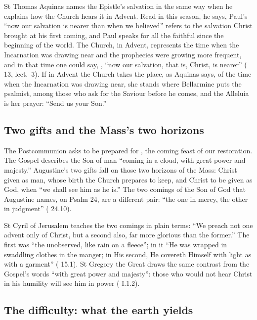 St Thomas Aquinas names the Epistle's salvation in the same way when he
explains how the Church hears it in Advent. Read in this season, he says,
Paul's ``now our salvation is nearer than when we believed'' refers to the
salvation Christ brought at his first coming, and Paul speaks for all the
faithful since the beginning of the world. The Church, in
Advent, represents the time when the Incarnation was drawing near and the
prophecies were growing more frequent, and in that time one could say,
, ``now our
salvation, that is, Christ, is nearer'' (
13, lect.~3). If in Advent the Church takes the place, as Aquinas says, of the
time when the Incarnation was drawing near, she stands where Bellarmine puts
the psalmist, among those who ask for the Saviour before he comes, and the
Alleluia is her prayer: ``Send us your Son.''

\subsection{Two gifts and the Mass's two horizons}

The Postcommunion asks to be prepared for , the coming feast of our restoration. The Gospel describes the Son
of man ``coming in a cloud, with great power and majesty.'' Augustine's two
gifts fall on those two horizons of the Mass: Christ given as man, whose birth
the Church prepares to keep, and Christ to be given as God, when ``we shall see
him as he is.'' The two comings of the Son of God that Augustine names, on
Psalm 24, are a different pair: ``the one in mercy, the other in judgment''
( 24.10).

St Cyril of Jerusalem teaches the two comings in plain terms: ``We preach not
one advent only of Christ, but a second also, far more glorious than the
former.'' The first was ``the unobserved, like rain on a fleece''; in it ``He
was wrapped in swaddling clothes in the manger; in His second, He covereth
Himself with light as with a garment'' ( 15.1).
St Gregory the Great draws the same contrast from the Gospel's words ``with
great power and majesty'': those who would not hear Christ in his humility
will see him in power ( I.1.2).

\subsection{The difficulty: what the earth yields}

